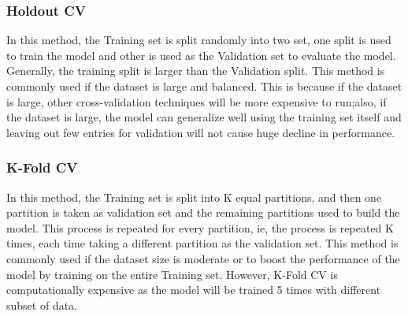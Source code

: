 \documentclass[twoside,11pt,a4paper]{article}
\begin{document}
\subsubsection{Holdout \acs{CV}}\label{sec:holdout}
In this method, the Training set is split randomly into two set, one split is used to train the model and other is used as the Validation set to evaluate the model. Generally, the training split is larger than the Validation split. This method is commonly used if the dataset is large and balanced. This is because if the dataset is large, other cross-validation techniques will be more expensive to run;also, if the dataset is large, the model can generalize well using the training set itself and leaving out few entries for validation will not cause huge decline in performance.
\subsubsection{K-Fold \acs{CV}}\label{sec:kfold}
In this method, the Training set is split into K equal partitions, and then one partition is taken as validation set and the remaining partitions used to build the model. This process is repeated for every partition, ie, the process is repeated K times, each time taking a different partition as the validation set. This method is commonly used if the dataset size is moderate or to boost the performance of the model by training on the entire Training set. However, K-Fold \acs{CV} is computationally expensive as the model will be trained 5 times with different subset of data.
\end{document}
